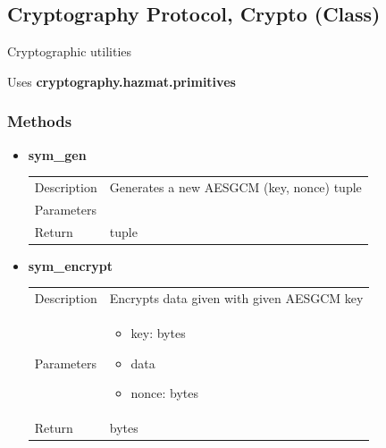 \documentclass[11pt]{article}
\begin{document}
\subsection{Cryptography Protocol, Crypto
(Class)}\label{cryptography-protocol-crypto-class}

Cryptographic utilities

Uses \textbf{cryptography.hazmat.primitives}

\subsubsection{Methods}\label{methods}

\begin{itemize}
\item
  \textbf{sym\_gen} 
	
	
  \begin{longtable}[]{@{}ll@{}}
  \toprule
  \endhead
  Description & Generates a new AESGCM (key, nonce) tuple\tabularnewline
  \begin{minipage}[t]{0.40\columnwidth}\raggedright
  Parameters\strut
  \end{minipage} & \begin{minipage}[t]{0.54\columnwidth}\raggedright
\strut
  \end{minipage}\tabularnewline
  \begin{minipage}[t]{0.40\columnwidth}\raggedright
  Return\strut
  \end{minipage} & \begin{minipage}[t]{0.54\columnwidth}\raggedright
	tuple \strut
  \end{minipage}\tabularnewline
  \bottomrule
  \end{longtable}
  
  
\item
  \textbf{sym\_encrypt} 
  
		
  \begin{longtable}[]{@{}ll@{}}
  \toprule
  \endhead
  Description & Encrypts data given with given AESGCM key\tabularnewline
  \begin{minipage}[t]{0.40\columnwidth}\raggedright
  Parameters\strut
  \end{minipage} & \begin{minipage}[t]{0.54\columnwidth}\raggedright
  \begin{itemize}
  	\item key: bytes
  	\item data
  	\item  nonce: bytes
  \end{itemize} \strut
  \end{minipage}\tabularnewline
  \begin{minipage}[t]{0.40\columnwidth}\raggedright
  Return \strut
  \end{minipage} & \begin{minipage}[t]{0.54\columnwidth}\raggedright
	bytes \strut
  \end{minipage}\tabularnewline
  \bottomrule
  \end{longtable}
  

\end{itemize}
\end{document}
